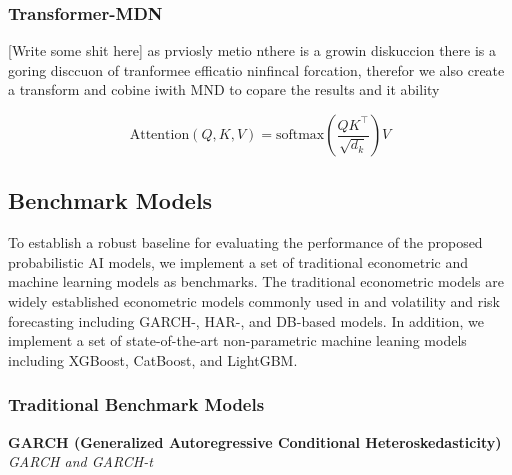 


\subsubsection{Transformer-MDN} 
[Write some shit here]
as prviosly metio nthere is a growin diskuccion there is a goring disccuon of tranformee efficatio ninfincal forcation, therefor we also create a transform and cobine iwith MND to copare the results and it ability 

\begin{equation}
    \text{Attention}(Q, K, V) = \text{softmax}\left( \frac{QK^\top}{\sqrt{d_k}} \right) V
\end{equation}





\subsection{Benchmark Models}
\label{sec:benchmark_models}
To establish a robust baseline for evaluating the performance of the proposed probabilistic AI models, we implement a set of traditional econometric and machine learning models as benchmarks. The traditional econometric models are widely established econometric models commonly used in and volatility and risk forecasting including GARCH-, HAR-, and DB-based models. In addition, we implement a set of state-of-the-art non-parametric machine leaning models including XGBoost, CatBoost, and LightGBM. 

\subsubsection{Traditional Benchmark Models}

\textbf{GARCH (Generalized Autoregressive Conditional Heteroskedasticity)} \\
\textit{GARCH and GARCH-t}

